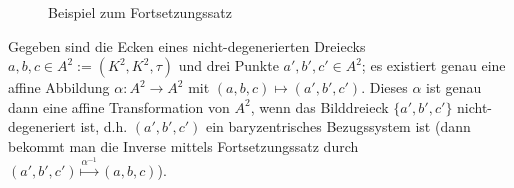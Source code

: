 \begin{figure}[ht]
 			\caption{Beispiel zum Fortsetzungssatz}
 		\end{figure}


 		Gegeben sind die Ecken eines nicht-degenerierten Dreiecks $ a,b,c\in A^2 := (K^2,K^2,\tau) $ und drei Punkte $ a',b',c'\in A^2 $; es existiert genau eine affine Abbildung $ \alpha:A^2\to A^2 $ mit $ (a,b,c)\mapsto (a',b',c') $. Dieses $ \alpha $ ist genau dann eine affine Transformation von $ A^2 $, wenn das Bilddreieck $ \{a',b',c'\} $ nicht-degeneriert ist, d.h. $ (a',b',c') $ ein baryzentrisches Bezugssystem ist (dann bekommt man die Inverse mittels Fortsetzungssatz durch $ (a',b',c') \overset{\alpha^{-1}}{\mapsto} (a,b,c) $).
